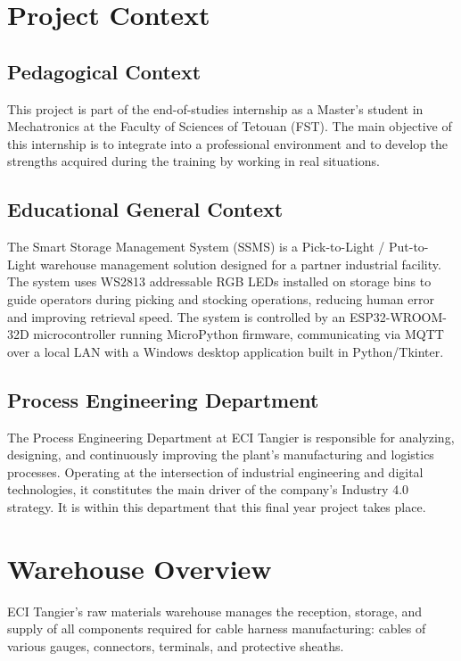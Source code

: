 \section{Project Context}
\label{sec:project-context}

\subsection{Pedagogical Context}

This project is part of the end-of-studies internship as a Master's student in Mechatronics at the Faculty of Sciences of Tetouan (FST). The main objective of this internship is to integrate into a professional environment and to develop the strengths acquired during the training by working in real situations.

\subsection{Educational General Context}

The Smart Storage Management System (SSMS) is a Pick-to-Light / Put-to-Light warehouse management solution designed for a partner industrial facility. The system uses WS2813 addressable RGB LEDs installed on storage bins to guide operators during picking and stocking operations, reducing human error and improving retrieval speed. The system is controlled by an ESP32-WROOM-32D microcontroller running MicroPython firmware, communicating via MQTT over a local LAN with a Windows desktop application built in Python/Tkinter.

\subsection{Process Engineering Department}

The Process Engineering Department at ECI Tangier is responsible for analyzing, designing, and continuously improving the plant's manufacturing and logistics processes. Operating at the intersection of industrial engineering and digital technologies, it constitutes the main driver of the company's Industry 4.0 strategy. It is within this department that this final year project takes place.

\section{Warehouse Overview}
\label{sec:warehouse}

ECI Tangier's raw materials warehouse manages the reception, storage, and supply of all components required for cable harness manufacturing: cables of various gauges, connectors, terminals, and protective sheaths.

